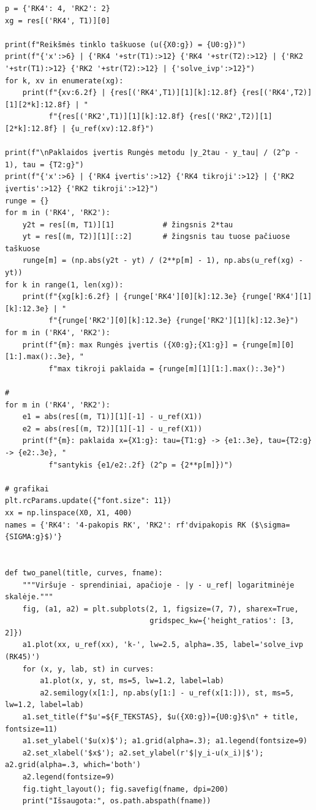 \documentclass[12pt,a4paper]{article}
\begin{document}
\begin{lstlisting}
p = {'RK4': 4, 'RK2': 2}
xg = res[('RK4', T1)][0]

print(f"Reikšmės tinklo taškuose (u({X0:g}) = {U0:g})")
print(f"{'x':>6} | {'RK4 '+str(T1):>12} {'RK4 '+str(T2):>12} | {'RK2 '+str(T1):>12} {'RK2 '+str(T2):>12} | {'solve_ivp':>12}")
for k, xv in enumerate(xg):
    print(f"{xv:6.2f} | {res[('RK4',T1)][1][k]:12.8f} {res[('RK4',T2)][1][2*k]:12.8f} | "
          f"{res[('RK2',T1)][1][k]:12.8f} {res[('RK2',T2)][1][2*k]:12.8f} | {u_ref(xv):12.8f}")

print(f"\nPaklaidos įvertis Rungės metodu |y_2tau - y_tau| / (2^p - 1), tau = {T2:g}")
print(f"{'x':>6} | {'RK4 įvertis':>12} {'RK4 tikroji':>12} | {'RK2 įvertis':>12} {'RK2 tikroji':>12}")
runge = {}
for m in ('RK4', 'RK2'):
    y2t = res[(m, T1)][1]           # žingsnis 2*tau
    yt = res[(m, T2)][1][::2]       # žingsnis tau tuose pačiuose taškuose
    runge[m] = (np.abs(y2t - yt) / (2**p[m] - 1), np.abs(u_ref(xg) - yt))
for k in range(1, len(xg)):
    print(f"{xg[k]:6.2f} | {runge['RK4'][0][k]:12.3e} {runge['RK4'][1][k]:12.3e} | "
          f"{runge['RK2'][0][k]:12.3e} {runge['RK2'][1][k]:12.3e}")
for m in ('RK4', 'RK2'):
    print(f"{m}: max Rungės įvertis ({X0:g};{X1:g}] = {runge[m][0][1:].max():.3e}, "
          f"max tikroji paklaida = {runge[m][1][1:].max():.3e}")

#
for m in ('RK4', 'RK2'):
    e1 = abs(res[(m, T1)][1][-1] - u_ref(X1))
    e2 = abs(res[(m, T2)][1][-1] - u_ref(X1))
    print(f"{m}: paklaida x={X1:g}: tau={T1:g} -> {e1:.3e}, tau={T2:g} -> {e2:.3e}, "
          f"santykis {e1/e2:.2f} (2^p = {2**p[m]})")

# grafikai 
plt.rcParams.update({"font.size": 11})
xx = np.linspace(X0, X1, 400)
names = {'RK4': '4-pakopis RK', 'RK2': rf'dvipakopis RK ($\sigma={SIGMA:g}$)'}


def two_panel(title, curves, fname):
    """Viršuje - sprendiniai, apačioje - |y - u_ref| logaritminėje skalėje."""
    fig, (a1, a2) = plt.subplots(2, 1, figsize=(7, 7), sharex=True,
                                 gridspec_kw={'height_ratios': [3, 2]})
    a1.plot(xx, u_ref(xx), 'k-', lw=2.5, alpha=.35, label='solve_ivp (RK45)')
    for (x, y, lab, st) in curves:
        a1.plot(x, y, st, ms=5, lw=1.2, label=lab)
        a2.semilogy(x[1:], np.abs(y[1:] - u_ref(x[1:])), st, ms=5, lw=1.2, label=lab)
    a1.set_title(f"$u'=${F_TEKSTAS}, $u({X0:g})={U0:g}$\n" + title, fontsize=11)
    a1.set_ylabel('$u(x)$'); a1.grid(alpha=.3); a1.legend(fontsize=9)
    a2.set_xlabel('$x$'); a2.set_ylabel(r'$|y_i-u(x_i)|$'); a2.grid(alpha=.3, which='both')
    a2.legend(fontsize=9)
    fig.tight_layout(); fig.savefig(fname, dpi=200)
    print("Išsaugota:", os.path.abspath(fname))



\end{lstlisting}
\end{document}
